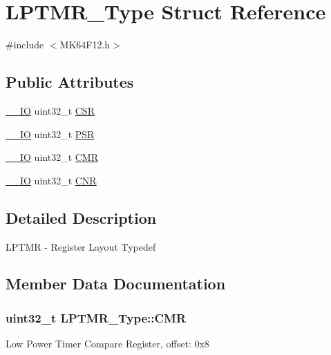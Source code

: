 \hypertarget{structLPTMR__Type}{}\section{L\+P\+T\+M\+R\+\_\+\+Type Struct Reference}
\label{structLPTMR__Type}


{\ttfamily \#include $<$M\+K64\+F12.\+h$>$}

\subsection*{Public Attributes}
\begin{DoxyCompactItemize}
\item 
\hyperlink{core__sc300_8h_aec43007d9998a0a0e01faede4133d6be}{\+\_\+\+\_\+\+IO} uint32\+\_\+t \hyperlink{structLPTMR__Type_a429aba6c7571f26fdc0c6315c0f920a7}{C\+SR}
\item 
\hyperlink{core__sc300_8h_aec43007d9998a0a0e01faede4133d6be}{\+\_\+\+\_\+\+IO} uint32\+\_\+t \hyperlink{structLPTMR__Type_a762750e61f8a71eae4ee81d9cc02fc51}{P\+SR}
\item 
\hyperlink{core__sc300_8h_aec43007d9998a0a0e01faede4133d6be}{\+\_\+\+\_\+\+IO} uint32\+\_\+t \hyperlink{structLPTMR__Type_aa5b60a4852b1f75b35ac4535ec8fde47}{C\+MR}
\item 
\hyperlink{core__sc300_8h_aec43007d9998a0a0e01faede4133d6be}{\+\_\+\+\_\+\+IO} uint32\+\_\+t \hyperlink{structLPTMR__Type_a9d7b37aa4696adb170d1834de319ff68}{C\+NR}
\end{DoxyCompactItemize}


\subsection{Detailed Description}
L\+P\+T\+MR -\/ Register Layout Typedef 

\subsection{Member Data Documentation}
\subsubsection[{\texorpdfstring{C\+MR}{CMR}}]{ uint32\+\_\+t L\+P\+T\+M\+R\+\_\+\+Type\+::\+C\+MR}\hypertarget{structLPTMR__Type_aa5b60a4852b1f75b35ac4535ec8fde47}{}\label{structLPTMR__Type_aa5b60a4852b1f75b35ac4535ec8fde47}
Low Power Timer Compare Register, offset\+: 0x8 
